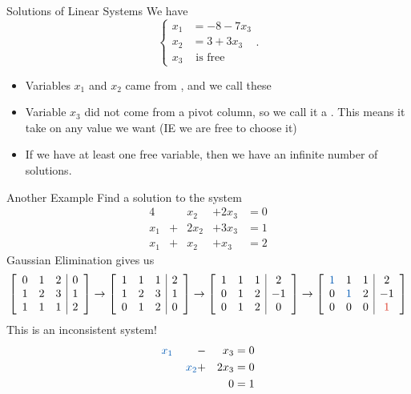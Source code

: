\documentclass[xcoler=dvipsnames, aspectratio=169]{beamer}
\begin{document}
    \begin{frame}{Solutions of Linear Systems}
        We have
        \[
            \begin{cases}
                x_1 &= -8-7x_3\\
                x_2 &= 3+3x_3\\
                x_3&\text{ is free}
            \end{cases}.
        \]
        \begin{itemize}
            \item Variables $x_1$ and $x_2$ came from , and we call these 
            \item Variable $x_3$ did not come from a pivot column, so we call it a . This means it take on any value we want (IE we are free to choose it)
            \item If we have at least one free variable, then we have an infinite number of solutions.
        \end{itemize}
    \end{frame}
    \begin{frame}{Another Example}
        \small
        Find a solution to the system
        \begin{alignat*}{4}
            \, &\,& x_2 &+ 2x_3 &= 0\\
            x_1&+& 2x_2 &+ 3x_3&= 1\\
            x_1&+&  x_2 &+ x_3&= 2
        \end{alignat*}
        Gaussian Elimination gives us
        \[
            \aMat{ccc|c}{
                0 & 1 & 2 & 0 \\
                1 & 2 & 3 & 1 \\
                1 & 1 & 1 & 2
            }\rightarrow\aMat{ccc|c}{
                1 & 1 & 1 & 2 \\
                1 & 2 & 3 & 1 \\
                0 & 1 & 2 & 0 
            }\rightarrow\aMat{ccc|c}{
                1 & 1 & 1 & 2 \\
                0 & 1 & 2 & -1 \\
                0 & 1 & 2 & 0 
            }\rightarrow\aMat{ccc|c}{
                \bText{1} & 1 & 1 & 2 \\
                0 & \bText{1} & 2 & -1 \\
                0 & 0 & 0 & \rText{1} 
            }
        \]
        This is an inconsistent system!
        \begin{alignat*}{4}
            \bText{x_1} &\,& \, &-& x_3 &= 0\\
            \,&\,& \bText{x_2} &+& 2x_3&= 0\\
            \,&\,& \, &\,& 0&= 1
        \end{alignat*}
    \end{frame}
\end{document}
